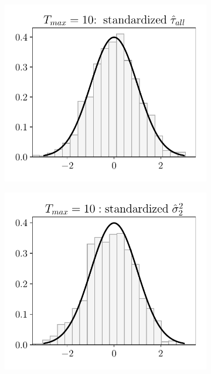 \begin{figure}[h!]
	\centering
	\begin{subfigure}{0.3\textwidth}
		\centering
		\includegraphics[width=1\linewidth]{plots/simulation/tau_T_10_adaptive.pdf}
	\end{subfigure}%
	\begin{subfigure}{0.3\textwidth}
		\centering
		\includegraphics[width=1\linewidth]{plots/simulation/sigma_2_T_10_adaptive.pdf}

\end{subfigure}
\end{figure}
